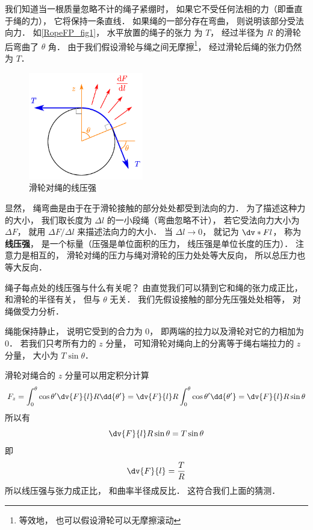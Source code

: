 

我们知道当一根质量忽略不计的绳子紧绷时， 如果它不受任何法相的力（即垂直于绳的力）， 它将保持一条直线． 如果绳的一部分存在弯曲， 则说明该部分受法向力． 如\autoref{RopeFP_fig1}， 水平放置的绳子的张力%
为 $T$， 经过半径为 $R$ 的滑轮后弯曲了 $\theta$ 角． 由于我们假设滑轮与绳之间无摩擦\footnote{等效地， 也可以假设滑轮可以无摩擦滚动}， 经过滑轮后绳的张力仍然为 $T$．
\begin{figure}[ht]
\centering
\includegraphics[width=5cm]{./figures/RopeFP_1.pdf}
\caption{滑轮对绳的线压强} \label{RopeFP_fig1}
\end{figure}

显然， 绳弯曲是由于在于滑轮接触的部分处处都受到法向的力． 为了描述这种力的大小， 我们取长度为 $\Delta l$ 的一小段绳（弯曲忽略不计）， 若它受法向力大小为 $\Delta F$， 就用 $\Delta F/\Delta l$ 来描述法向力的大小． 当 $\Delta l \to 0$， 就记为 $\dv*{F}{l}$， 称为\textbf{线压强}， 是一个标量（压强是单位面积的压力， 线压强是单位长度的压力）． 注意力是相互的， 滑轮对绳的压力与绳对滑轮的压力处处等大反向， 所以总压力也等大反向．

绳子每点处的线压强与什么有关呢？ 由直觉我们可以猜到它和绳的张力成正比， 和滑轮的半径有关， 但与 $\theta$ 无关． 我们先假设接触的部分先压强处处相等， 对绳做受力分析．

绳能保持静止， 说明它受到的合力为 0， 即两端的拉力以及滑轮对它的力相加为 0． 若我们只考所有力的 $z$ 分量， 可知滑轮对绳向上的分离等于绳右端拉力的 $z$ 分量， 大小为 $T \sin\theta$．

滑轮对绳合的 $z$ 分量可以用定积分计算
\begin{equation}
F_z = \int_0^\theta \cos\theta' \dv{F}{l} R\dd{\theta'}
= \dv{F}{l} R \int_0^\theta \cos\theta' \dd{\theta'}
= \dv{F}{l} R \sin\theta
\end{equation}
所以有
\begin{equation}
\dv{F}{l} R \sin\theta = T \sin\theta
\end{equation}
即
\begin{equation}\label{RopeFP_eq1}
\dv{F}{l} = \frac{T}{R}
\end{equation}
所以线压强与张力成正比， 和曲率半径成反比． 这符合我们上面的猜测．

